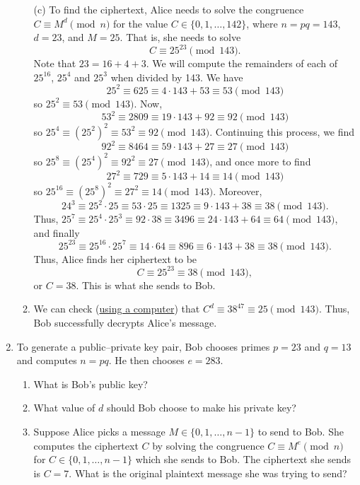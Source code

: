 \documentclass[11pt]{article}
\theoremstyle{plain}
\theoremstyle{definition}
\begin{document}
\begin{enumerate}
\begin{Solution}
\begin{enumerate}
\item[(c)] To find the ciphertext, Alice needs to solve the congruence $C\equiv M^d\pmod{n}$ for the value $C\in\{0,1,\dots,142\}$, where $n=pq=143$, $d=23$, and $M = 25$. That is, she needs to solve
\[
 C\equiv 25^{23}\pmod{143}.
\]
Note that $23 = 16 + 4 + 3$. We will compute the remainders of each of $25^{16}$, $25^{4}$ and $25^{3}$ when divided by 143.  We have
\[
 25^2\equiv 625 \equiv 4\cdot 143 + 53 \equiv 53\pmod{143}
\]
so $25^2\equiv53\pmod{143}$. Now,
\[
 53^2\equiv 2809 \equiv 19\cdot 143 + 92 \equiv 92\pmod{143}
\]
so $25^4\equiv(25^2)^2\equiv 53^2\equiv 92\pmod{143}$. Continuing this process, we find
\[
 92^2\equiv 8464 \equiv 59\cdot 143 + 27 \equiv 27\pmod{143}
\]
so $25^8\equiv(25^4)^2\equiv 92^2\equiv 27\pmod{143}$, and once more to find
\[
 27^2\equiv 729 \equiv 5\cdot 143 + 14 \equiv 14\pmod{143}
\]
so $25^{16}\equiv(25^8)^2\equiv 27^2\equiv 14\pmod{143}$. Moreover,
\[
 24^3 \equiv 25^2\cdot 25\equiv 53\cdot 25\equiv 1325\equiv 9\cdot 143 +38\equiv 38\pmod{143}.
\]
Thus, $25^7 \equiv 25^4\cdot25^3 \equiv 92\cdot 38\equiv 3496 \equiv 24\cdot 143 + 64 \equiv 64\pmod{143}$, and finally
\[
 25^{23}\equiv 25^{16}\cdot 25^7 \equiv 14\cdot 64\equiv 896 \equiv 6\cdot 143 + 38 \equiv 38\pmod{143}.
\]
Thus, Alice finds her ciphertext to be
\[
 C \equiv 25^{23}\equiv38\pmod{143},
\]
or $C=38$. This is what she sends to Bob.

\item We can check (\href{https://www.wolframalpha.com/input/?i=38\%5E47+mod+143}{using a computer}) that $C^{d}\equiv 38^{47} \equiv 25\pmod{143}$. Thus, Bob successfully decrypts Alice's message.
\end{enumerate}
\end{Solution}

 \item To generate a public--private key pair, Bob chooses primes $p=23$ and $q=13$ and computes $n=pq$. He then chooses $e=283$.
 \begin{enumerate}
  \item What is Bob's public key?
  \item What value of $d$ should Bob choose to make his private key?
  \item Suppose Alice picks a message $M\in\{0,1,\dots,n-1\}$ to send to Bob. She computes the ciphertext $C$ by solving the congruence $C\equiv M^e\pmod{n}$ for $C\in\{0,1,\dots,n-1\}$ which she sends to Bob. The ciphertext she sends is $C=7$. What is the original plaintext message she was trying to send?
 \end{enumerate}



\end{enumerate}
\end{document}
